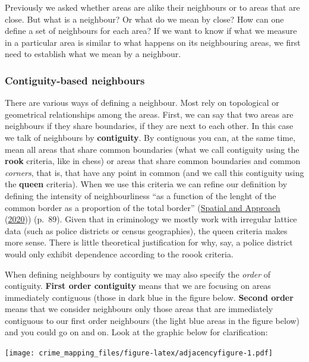 \documentclass[
  krantz2]{krantz}
\begin{document}
Previously we asked whether areas are alike their neighbours or to areas that are close. But what is a neighbour? Or what do we mean by close? How can one define a set of neighbours for each area? If we want to know if what we measure in a particular area is similar to what happens on its neighbouring areas, we first need to establish what we mean by a neighbour.

\hypertarget{contiguity-based-neighbours}{%
\subsubsection{Contiguity-based neighbours}\label{contiguity-based-neighbours}}

There are various ways of defining a neighbour. Most rely on topological or geometrical relationships among the areas. First, we can say that two areas are neighbours if they share boundaries, if they are next to each other. In this case we talk of neighbours by \textbf{contiguity}. By contiguous you can, at the same time, mean all areas that share common boundaries (what we call contiguity using the \textbf{rook} criteria, like in chess) or areas that share common boundaries and common \emph{corners}, that is, that have any point in common (and we call this contiguity using the \textbf{queen} criteria). When we use this criteria we can refine our definition by defining the intensity of neighbourliness ``as a function of the lenght of the common border as a proportion of the total border'' (\protect\hyperlink{ref-Haining_2020}{Spatial and Approach} (\protect\hyperlink{ref-Haining_2020}{2020})) (p.~89). Given that in criminology we mostly work with irregular lattice data (such as police districts or census geographies), the queen criteria makes more sense. There is little theoretical justification for why, say, a police district would only exhibit dependence according to the roook criteria.

When defining neighbours by contiguity we may also specify the \emph{order} of contiguity. \textbf{First order contiguity} means that we are focusing on areas immediately contiguous (those in dark blue in the figure below. \textbf{Second order} means that we consider neighbours only those areas that are immediately contiguous to our first order neighbours (the light blue areas in the figure below) and you could go on and on. Look at the graphic below for clarification:

\texttt{[image: crime\_mapping\_files/figure-latex/adjacencyfigure-1.pdf]}
\end{document}
